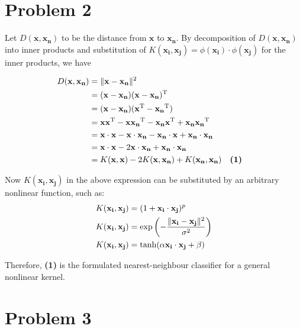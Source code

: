 \documentclass[twoside,11pt]{homework}
\newcommand{\vect}[1]{\boldsymbol{\mathbf{#1}}}
\begin{document}
\section*{Problem 2}

Let $D(\vect{x},\vect{x_n})$ to be the distance from $\vect{x}$ to $\vect{x_n}$. By decomposition of  $D(\vect{x},\vect{x_n})$ into inner products
and substitution of $K(\vect{x_i},\vect{x_j}) = \phi(\vect{x_i}) \cdot \phi(\vect{x_j})$ for the inner products, we have


\begin{align*}
D(\vect{x},\vect{x_n}) 
&= \Arrowvert \vect{x} - \vect{x_n} \Arrowvert ^2 \\
&= ( \vect{x} - \vect{x_n} ) ( \vect{x} - \vect{x_n} ) ^\mathrm{T} \\
&= ( \vect{x} - \vect{x_n} ) ( \vect{x} ^\mathrm{T} - \vect{x_n} ^\mathrm{T}) \\
&= \vect{x} \vect{x} ^\mathrm{T} - \vect{x} \vect{x_n} ^\mathrm{T} - \vect{x_n} \vect{x} ^\mathrm{T} + \vect{x_n} \vect{x_n} ^\mathrm{T} \\
&= \vect{x} \cdot \vect{x} - \vect{x} \cdot \vect{x_n} - \vect{x_n} \cdot \vect{x} + \vect{x_n} \cdot \vect{x_n} \\
&= \vect{x} \cdot \vect{x} - 2\vect{x} \cdot \vect{x_n} + \vect{x_n} \cdot \vect{x_n} \\
&= K(\vect{x} , \vect{x}) - 2K(\vect{x} , \vect{x_n}) + K(\vect{x_n} , \vect{x_n} )   &&\mbox{\textbf{(1)}}
\end{align*}

Now $K(\vect{x_i},\vect{x_j})$ in the above expression can be substituted by an arbitrary nonlinear function, such as:
\begin{align*}
K(\vect{x_i},\vect{x_j}) &= (1 + \vect{x_i} \cdot \vect{x_j} )^p \\
K(\vect{x_i},\vect{x_j}) &= \exp \left( -\frac{\Arrowvert \vect{x_i} - \vect{x_j} \Arrowvert ^2}{\sigma ^2}          \right) \\
K(\vect{x_i},\vect{x_j}) &= \tanh (\alpha \vect{x_i} \cdot \vect{x_j} + \beta)
\end{align*}

Therefore, \textbf{(1)} is the formulated nearest-neighbour classifier for a general nonlinear kernel.



\section*{Problem 3}
\end{document}
